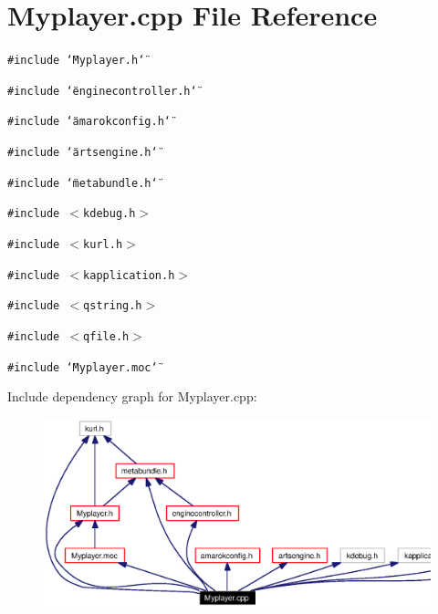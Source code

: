 \section{Myplayer.cpp File Reference}
\label{Myplayer_8cpp}


{\tt \#include \char`\"{}Myplayer.h\char`\"{}}\par
{\tt \#include \char`\"{}enginecontroller.h\char`\"{}}\par
{\tt \#include \char`\"{}amarokconfig.h\char`\"{}}\par
{\tt \#include \char`\"{}artsengine.h\char`\"{}}\par
{\tt \#include \char`\"{}metabundle.h\char`\"{}}\par
{\tt \#include $<$kdebug.h$>$}\par
{\tt \#include $<$kurl.h$>$}\par
{\tt \#include $<$kapplication.h$>$}\par
{\tt \#include $<$qstring.h$>$}\par
{\tt \#include $<$qfile.h$>$}\par
{\tt \#include \char`\"{}Myplayer.moc\char`\"{}}\par


Include dependency graph for Myplayer.cpp:\begin{figure}[H]
\begin{center}
\leavevmode
\includegraphics[width=381pt]{Myplayer_8cpp__incl}
\end{center}
\end{figure}

